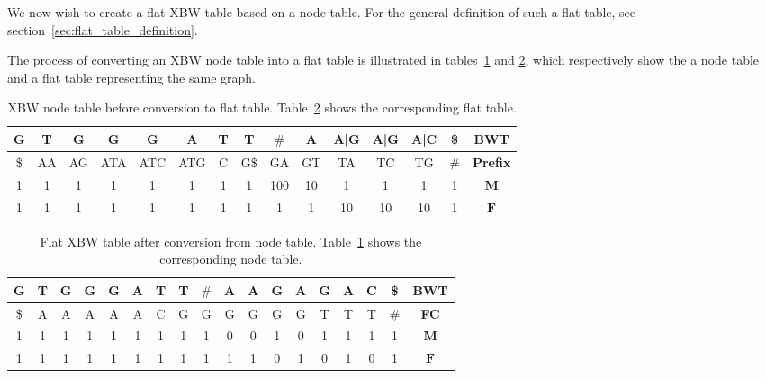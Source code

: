 \documentclass[a4paper,12pt,twoside,BCOR=10mm]{scrbook}
\begin{document}
We now wish to create a flat XBW table based on a node table.
For the general definition of such a flat table, see section~\ref{sec:flat_table_definition}.

The process of converting an XBW node table into a flat table is illustrated in tables~\ref{table:evo_node_to_flat_node}
and \ref{table:evo_node_to_flat_flat}, which respectively show the a node table and a flat table representing the same graph. \\
{
\renewcommand{\tabcolsep}{5pt}
\begin{table}[htb]
\centering
\caption[XBW node table before conversion to flat table]{XBW node table before conversion to flat table.
Table~\ref{table:evo_node_to_flat_flat} shows the corresponding flat table.}
\begin{tabular}{ | c | c | c | c | c | c | c | c | c | c | c | c | c | c | c | }
\hline
G & T & G & G & G & A & T & T & $\#$ & A & A|G & A|G & A|C & \$ & \textbf{BWT} \\ \hline
\$ & AA & AG & ATA & ATC & ATG & C & G\$ & GA & GT & TA & TC & TG & $\#$ & \textbf{Prefix} \\ \hline
1 & 1 & 1 & 1 & 1 & 1 & 1 & 1 & 100 & 10 & 1 & 1 & 1 & 1 & $\boldsymbol{M}$ \\ \hline
1 & 1 & 1 & 1 & 1 & 1 & 1 & 1 & 1 & 1 & 10 & 10 & 10 & 1 & $\boldsymbol{F}$ \\ \hline
\end{tabular}
\label{table:evo_node_to_flat_node}
\end{table}
}
\begin{table}[htb]
\centering
\caption[Flat XBW table after conversion from node table]{Flat XBW table after conversion from node table.
Table~\ref{table:evo_node_to_flat_node} shows the corresponding node table.}
\begin{tabular}{ | c | c | c | c | c | c | c | c | c | c | c | c | c | c | c | c | c | c | }
\hline
G & T & G & G & G & A & T & T & $\#$ & A & A & G & A & G & A & C & \$ & \textbf{BWT} \\ \hline
\$ & A & A & A & A & A & C & G & G & G & G & G & G & T & T & T & $\#$ & \textbf{FC} \\ \hline
1 & 1 & 1 & 1 & 1 & 1 & 1 & 1 & 1 & 0 & 0 & 1 & 0 & 1 & 1 & 1 & 1 & $\boldsymbol{M}$ \\ \hline
1 & 1 & 1 & 1 & 1 & 1 & 1 & 1 & 1 & 1 & 1 & 0 & 1 & 0 & 1 & 0 & 1 & $\boldsymbol{F}$ \\ \hline
\end{tabular}
\label{table:evo_node_to_flat_flat}
\end{table}
\end{document}
